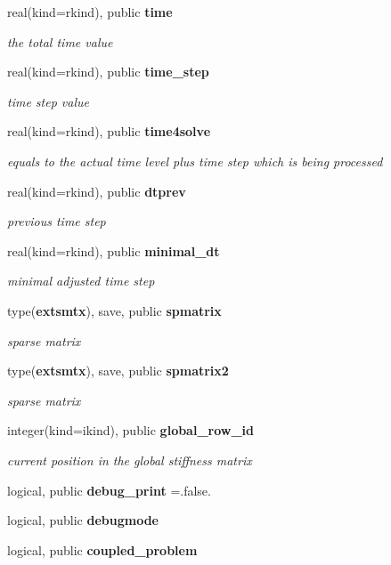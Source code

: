 \begin{DoxyCompactItemize}
real(kind=rkind), public {\bf time}
\begin{DoxyCompactList}\small\item\em the total time value \end{DoxyCompactList}\item 
real(kind=rkind), public {\bf time\+\_\+step}
\begin{DoxyCompactList}\small\item\em time step value \end{DoxyCompactList}\item 
real(kind=rkind), public {\bf time4solve}
\begin{DoxyCompactList}\small\item\em equals to the actual time level plus time step which is being processed \end{DoxyCompactList}\item 
real(kind=rkind), public {\bf dtprev}
\begin{DoxyCompactList}\small\item\em previous time step \end{DoxyCompactList}\item 
real(kind=rkind), public {\bf minimal\+\_\+dt}
\begin{DoxyCompactList}\small\item\em minimal adjusted time step \end{DoxyCompactList}\item 
type({\bf extsmtx}), save, public {\bf spmatrix}
\begin{DoxyCompactList}\small\item\em sparse matrix \end{DoxyCompactList}\item 
type({\bf extsmtx}), save, public {\bf spmatrix2}
\begin{DoxyCompactList}\small\item\em sparse matrix \end{DoxyCompactList}\item 
integer(kind=ikind), public {\bf global\+\_\+row\+\_\+id}
\begin{DoxyCompactList}\small\item\em current position in the global stiffness matrix \end{DoxyCompactList}\item 
logical, public {\bf debug\+\_\+print} =.false.
\item 
logical, public {\bf debugmode}
\item 
logical, public {\bf coupled\+\_\+problem}

\end{DoxyCompactItemize}
